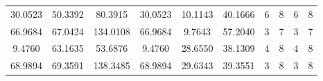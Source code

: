 \documentclass[withoutpreface,bwprint]{cumcmthesis} %
\begin{document}
\begin{appendices}
\begin{table}[htbp!]
\begin{tabular}{@{}cccccccccc@{}}
							30.0523                          & 50.3392                          & 80.3915                          & 30.0523                          & 10.1143                          & 40.1666                          & 6                    & 8                    & 6                      & 8                      \\
							66.9684                          & 67.0424                          & 134.0108                         & 66.9684                          & 9.7643                           & 57.2040                          & 3                    & 7                    & 3                      & 7                      \\
							9.4760                           & 63.1635                          & 53.6876                          & 9.4760                           & 28.6550                          & 38.1309                          & 4                    & 8                    & 4                      & 8                      \\
							68.9894                          & 69.3591                          & 138.3485                         & 68.9894                          & 29.6343                          & 39.3551                          & 3                    & 8                    & 3                      & 8                      \\ \bottomrule
						\end{tabular}
					\end{table}
				

\end{appendices}
\end{document}
